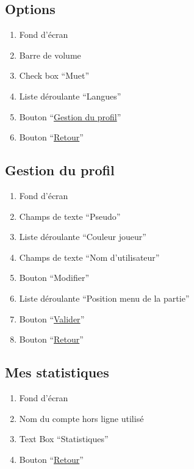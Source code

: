 \documentclass{report}
\begin{document}
	
\newpage

	\subsection{Options}
	
		\hypertarget{Options}{}
		\label{Options}
	
		
		
		\begin{enumerate}
		  \item Fond d'écran
		  \item Barre de volume
		  \item Check box ``Muet''
		  \item Liste déroulante ``Langues''
		  \item Bouton ``\hyperlink{Page d'accueil}{Gestion du profil}''
		  \item Bouton ``\hyperlink{Page d'accueil}{Retour}''
		\end{enumerate}

	
\newpage

	\subsection{Gestion du profil}
	
		\hypertarget{Gestion du profil}{}
		\label{Gestion du profil}
		
		
		
		\begin{enumerate}
		  \item Fond d'écran
		  \item Champs de texte ``Pseudo''
		  \item Liste déroulante ``Couleur joueur''
		  \item Champs de texte ``Nom d'utilisateur''
		  \item Bouton ``Modifier''
		  \item Liste déroulante ``Position menu de la partie''
		  \item Bouton ``\hyperlink{Options}{Valider}''
		  \item Bouton ``\hyperlink{Options}{Retour}''
		\end{enumerate}
	
\newpage

	\subsection{Mes statistiques}
	
		
		
		\hypertarget{Statistiques}{}
		\label{Statistiques}
		
		\begin{enumerate}
		  \item Fond d'écran
		  \item Nom du compte hors ligne utilisé
		  \item Text Box ``Statistiques''
		  \item Bouton ``\hyperlink{Acceuil}{Retour}''
		\end{enumerate}
	
\newpage
	
\end{document}

